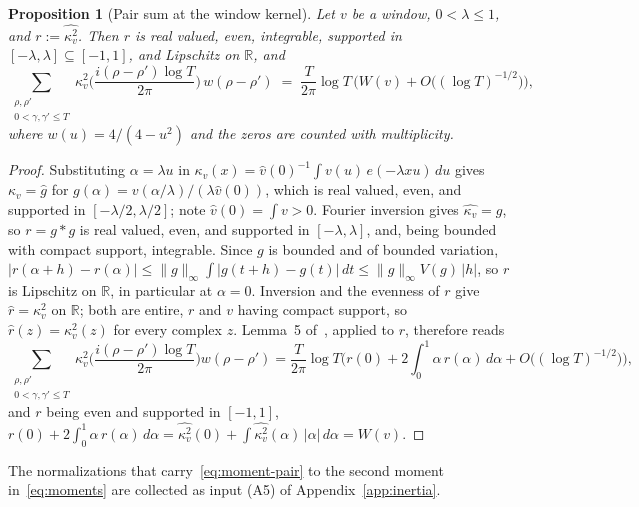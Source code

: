\documentclass[11pt]{article}
\newtheorem{proposition}[theorem]{Proposition}
\theoremstyle{definition}
\newcommand{\R}{\mathbb{R}}
\begin{document}
\begin{proposition}[Pair sum at the window kernel]\label{prop:moment}
Let $v$ be a window, $0<\lambda\le1$, and $r:=\widehat{\kappa_v^2}$. Then $r$ is
real valued, even, integrable, supported in $[-\lambda,\lambda]\subseteq[-1,1]$,
and Lipschitz on $\R$, and
\begin{equation}\label{eq:moment-pair}
  \sum_{\substack{\rho,\rho'\\ 0<\gamma,\gamma'\le T}}
    \kappa_v^2\!\Big(\frac{i(\rho-\rho')\log T}{2\pi}\Big)\,w(\rho-\rho')
  \;=\;\frac{T}{2\pi}\log T\,\Big(W(v)+O\big((\log T)^{-1/2}\big)\Big),
\end{equation}
where $w(u)=4/(4-u^2)$ and the zeros are counted with multiplicity.
\end{proposition}

\begin{proof}
Substituting $\alpha=\lambda u$ in
$\kappa_v(x)=\widehat v(0)^{-1}\!\int v(u)\,e(-\lambda xu)\,du$ gives
$\kappa_v=\widehat g$ for $g(\alpha)=v(\alpha/\lambda)/(\lambda\widehat v(0))$,
which is real valued, even, and supported in $[-\lambda/2,\lambda/2]$; note
$\widehat v(0)=\int v>0$. Fourier inversion gives $\widehat{\kappa_v}=g$, so
$r=g*g$ is real valued, even, and supported in $[-\lambda,\lambda]$, and, being
bounded with compact support, integrable. Since $g$ is bounded and of bounded
variation,
$|r(\alpha+h)-r(\alpha)|\le\|g\|_\infty\!\int|g(t+h)-g(t)|\,dt\le\|g\|_\infty V(g)\,|h|$,
so $r$ is Lipschitz on $\R$, in particular at $\alpha=0$. Inversion and the
evenness of $r$ give $\widehat r=\kappa_v^2$ on $\R$; both are entire, $r$ and
$v$ having compact support, so $\widehat r(z)=\kappa_v^2(z)$ for every complex
$z$. Lemma~5 of~\cite{BGSTB24}, applied to $r$, therefore reads
\[
  \sum_{\substack{\rho,\rho'\\ 0<\gamma,\gamma'\le T}}
    \kappa_v^2\!\Big(\frac{i(\rho-\rho')\log T}{2\pi}\Big)w(\rho-\rho')
  =\frac{T}{2\pi}\log T\Big(r(0)+2\!\int_0^1\!\alpha\,r(\alpha)\,d\alpha
    +O\big((\log T)^{-1/2}\big)\Big),
\]
and $r$ being even and supported in $[-1,1]$,
$r(0)+2\int_0^1\alpha\,r(\alpha)\,d\alpha
=\widehat{\kappa_v^2}(0)+\int\widehat{\kappa_v^2}(\alpha)\,|\alpha|\,d\alpha=W(v)$.
\end{proof}

The normalizations that carry~\eqref{eq:moment-pair} to the second moment
in~\eqref{eq:moments} are collected as input (A5) of
Appendix~\ref{app:inertia}.
\end{document}
